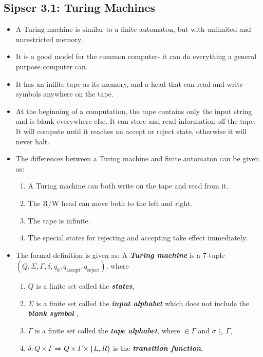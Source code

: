 \documentclass{article}
\begin{document}
\subsection{Sipser 3.1: Turing Machines}
\begin{itemize}
    \item A Turing machine is similar to a finite automaton, but with unlimited and unrestricted memory.
    \item It is a good model for the common computer- it can do everything a general purpose computer can.
    \item It has an inifite tape as its memory, and a head that can read and write symbols anywhere on the tape.
    \item At the beginning of a computation, the tape contains only the input string and is blank everywhere else. It can store and read information off the tape. It will compute until it reaches an accept or reject state, otherwise it will never halt.
    \item The differences between a Turing machine and finite automaton can be given as:
    \begin{enumerate}
        \item A Turing machine can both write on the tape and read from it.
        \item The R/W head can move both to the left and right.
        \item The tape is infinite.
        \item The special states for rejecting and accepting take effect immediately.
    \end{enumerate}
    \item The formal definition is given as: A \textbf{\textit{Turing machine}} is a 7-tuple $(Q,\Sigma,\Gamma,\delta,q_0,q_\textrm{accept},q_\textrm{reject})$, where 
    \begin{enumerate}
        \item $Q$ is a finite set called the \textbf{\textit{states}},
        \item $\Sigma$ is a finite set called the \textbf{\textit{input alphabet}} which does not include the \textbf{\textit{blank symbol}} \textvisiblespace,
        \item $\Gamma$ is a finite set called the \textbf{\textit{tape alphabet}}, where \textvisiblespace$\in\Gamma$ and $\sigma\subseteq\Gamma$,
        \item $\delta: Q \times \Gamma \Rightarrow Q \times \Gamma \times \{L,R\}$ is the \textbf{\textit{transition function}},

\end{enumerate}
\end{itemize}
\end{document}
